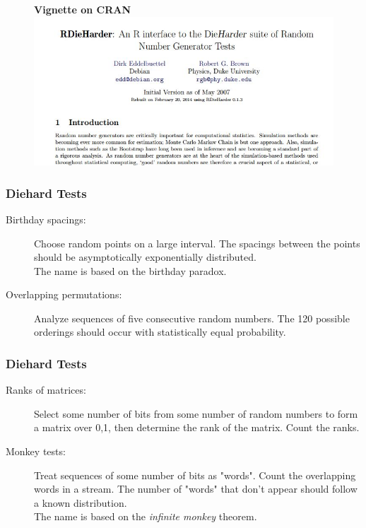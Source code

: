 \documentclass[MAIN.tex]{subfiles}
\begin{document}
\begin{frame}
	\begin{figure}
\textbf{Vignette on CRAN}
\centering
\includegraphics[width=1.05\linewidth]{images/Rdieharder2}

\end{figure}

\end{frame}
\begin{frame}[fragile]
\frametitle{Diehard Tests}
\large
\begin{description}
\item[Birthday spacings:] Choose random points on a large interval. The spacings between the points should be asymptotically exponentially distributed.\\ The name is based on the birthday paradox. \bigskip
\item[Overlapping permutations:] Analyze sequences of five consecutive random numbers. The 120 possible orderings should occur with statistically equal probability.
\end{description}
\end{frame}
\begin{frame}[fragile]
\frametitle{Diehard Tests}
\large
\begin{description}
\item[Ranks of matrices:] Select some number of bits from some number of random numbers to form a matrix over {0,1}, then determine the rank of the matrix. Count the ranks. \bigskip
\item[Monkey tests:] Treat sequences of some number of bits as "words". Count the overlapping words in a stream. The number of "words" that don't appear should follow a known distribution.\\ The name is based on the \textit{infinite monkey} theorem.
\end{description}
\end{frame}
\end{document}
